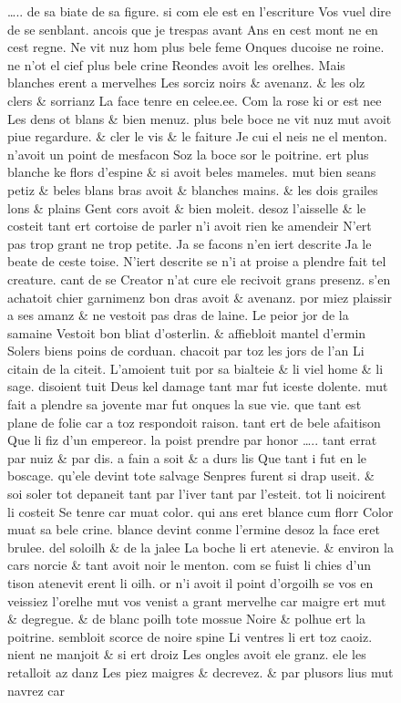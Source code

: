 \documentclass[
  letterpaper,
  DIV=11,
  numbers=noendperiod,
  oneside]{scrreprt}
\begin{document}
\begin{figure}
\ldots.. de sa biate de sa figure. si com ele est en l'escriture Vos
vuel dire de se senblant. ancois que je trespas avant Ans en cest mont
ne en cest regne. Ne vit nuz hom plus bele feme Onques ducoise ne roine.
ne n'ot el cief plus bele crine Reondes avoit les orelhes. Mais blanches
erent a mervelhes Les sorciz noirs \& avenanz. \& les olz clers \&
sorrianz La face tenre en celee.ee. Com la rose ki or est nee Les dens
ot blans \& bien menuz. plus bele boce ne vit nuz mut avoit piue
regardure. \& cler le vis \& le faiture Je cui el neis ne el menton.
n'avoit un point de mesfacon Soz la boce sor le poitrine. ert plus
blanche ke flors d'espine \& si avoit beles mameles. mut bien seans
petiz \& beles blans bras avoit \& blanches mains. \& les dois grailes
lons \& plains Gent cors avoit \& bien moleit. desoz l'aisselle \& le
costeit tant ert cortoise de parler n'i avoit rien ke amendeir N'ert pas
trop grant ne trop petite. Ja se facons n'en iert descrite Ja le beate
de ceste toise. N'iert descrite se n'i at proise a plendre fait tel
creature. cant de se Creator n'at cure ele recivoit grans presenz. s'en
achatoit chier garnimenz bon dras avoit \& avenanz. por miez plaissir a
ses amanz \& ne vestoit pas dras de laine. Le peior jor de la samaine
Vestoit bon bliat d'osterlin. \& affiebloit mantel d'ermin Solers biens
poins de corduan. chacoit par toz les jors de l'an Li citain de la
citeit. L'amoient tuit por sa bialteie \& li viel home \& li sage.
disoient tuit Deus kel damage tant mar fut iceste dolente. mut fait a
plendre sa jovente mar fut onques la sue vie. que tant est plane de
folie car a toz respondoit raison. tant ert de bele afaitison Que li fiz
d'un empereor. la poist prendre par honor \ldots.. tant errat par nuiz
\& par dis. a fain a soit \& a durs lis Que tant i fut en le boscage.
qu'ele devint tote salvage Senpres furent si drap useit. \& soi soler
tot depaneit tant par l'iver tant par l'esteit. tot li noicirent li
costeit Se tenre car muat color. qui ans eret blance cum florr Color
muat sa bele crine. blance devint conme l'ermine desoz la face eret
brulee. del soloilh \& de la jalee La boche li ert atenevie. \& environ
la cars norcie \& tant avoit noir le menton. com se fuist li chies d'un
tison atenevit erent li oilh. or n'i avoit il point d'orgoilh se vos en
veissiez l'orelhe mut vos venist a grant mervelhe car maigre ert mut \&
degregue. \& de blanc poilh tote mossue Noire \& polhue ert la poitrine.
sembloit scorce de noire spine Li ventres li ert toz caoiz. nient ne
manjoit \& si ert droiz Les ongles avoit ele granz. ele les retalloit az
danz Les piez maigres \& decrevez. \& par plusors lius mut navrez car

\end{figure}
\end{document}
